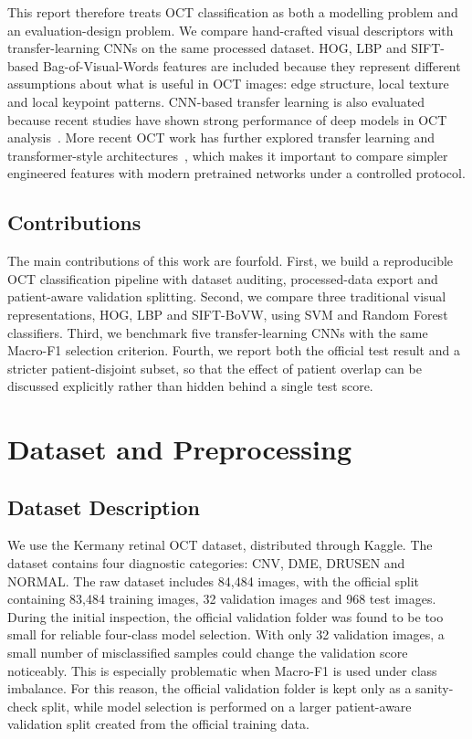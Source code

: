 \documentclass[10pt,twocolumn,letterpaper]{article}
\begin{document}
This report therefore treats OCT classification as both a modelling problem and an evaluation-design problem. We compare hand-crafted visual descriptors with transfer-learning CNNs on the same processed dataset. HOG, LBP and SIFT-based Bag-of-Visual-Words features are included because they represent different assumptions about what is useful in OCT images: edge structure, local texture and local keypoint patterns. CNN-based transfer learning is also evaluated because recent studies have shown strong performance of deep models in OCT analysis~\cite{kermany2018,sunija2021,muchuchuti2023,koseoglu2023}. More recent OCT work has further explored transfer learning and transformer-style architectures~\cite{akca2024,jaimes2025}, which makes it important to compare simpler engineered features with modern pretrained networks under a controlled protocol.

\subsection{Contributions}
The main contributions of this work are fourfold. First, we build a reproducible OCT classification pipeline with dataset auditing, processed-data export and patient-aware validation splitting. Second, we compare three traditional visual representations, HOG, LBP and SIFT-BoVW, using SVM and Random Forest classifiers. Third, we benchmark five transfer-learning CNNs with the same Macro-F1 selection criterion. Fourth, we report both the official test result and a stricter patient-disjoint subset, so that the effect of patient overlap can be discussed explicitly rather than hidden behind a single test score.

\section{Dataset and Preprocessing}
\subsection{Dataset Description}
We use the Kermany retinal OCT dataset, distributed through Kaggle. The dataset contains four diagnostic categories: CNV, DME, DRUSEN and NORMAL. The raw dataset includes 84,484 images, with the official split containing 83,484 training images, 32 validation images and 968 test images. During the initial inspection, the official validation folder was found to be too small for reliable four-class model selection. With only 32 validation images, a small number of misclassified samples could change the validation score noticeably. This is especially problematic when Macro-F1 is used under class imbalance. For this reason, the official validation folder is kept only as a sanity-check split, while model selection is performed on a larger patient-aware validation split created from the official training data.
\end{document}
